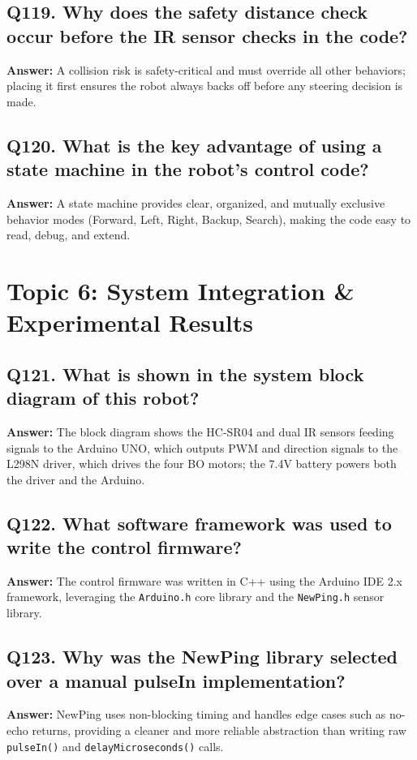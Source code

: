 \documentclass[12pt,a4paper,oneside]{report}
\begin{document}
\section{Q119. Why does the safety distance check occur before the IR sensor checks in the code?}
\textbf{Answer:} A collision risk is safety-critical and must override all other behaviors; placing it first ensures the robot always backs off before any steering decision is made.

\section{Q120. What is the key advantage of using a state machine in the robot's control code?}
\textbf{Answer:} A state machine provides clear, organized, and mutually exclusive behavior modes (Forward, Left, Right, Backup, Search), making the code easy to read, debug, and extend.

\chapter{Topic 6: System Integration \& Experimental Results}

\section{Q121. What is shown in the system block diagram of this robot?}
\textbf{Answer:} The block diagram shows the HC-SR04 and dual IR sensors feeding signals to the Arduino UNO, which outputs PWM and direction signals to the L298N driver, which drives the four BO motors; the 7.4V battery powers both the driver and the Arduino.

\section{Q122. What software framework was used to write the control firmware?}
\textbf{Answer:} The control firmware was written in C++ using the Arduino IDE 2.x framework, leveraging the \texttt{Arduino.h} core library and the \texttt{NewPing.h} sensor library.

\section{Q123. Why was the NewPing library selected over a manual pulseIn implementation?}
\textbf{Answer:} NewPing uses non-blocking timing and handles edge cases such as no-echo returns, providing a cleaner and more reliable abstraction than writing raw \texttt{pulseIn()} and \texttt{delayMicroseconds()} calls.
\end{document}
